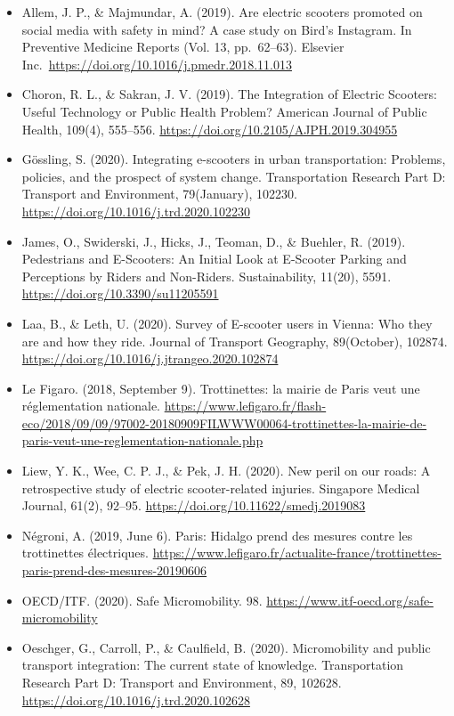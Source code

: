 \documentclass[
]{book}
\providecommand{\tightlist}{%
  \setlength{\itemsep}{0pt}\setlength{\parskip}{0pt}}
\begin{document}
\begin{itemize}
\tightlist
\item
  Allem, J. P., \& Majmundar, A. (2019). Are electric scooters promoted on social media with safety in mind? A case study on Bird's Instagram. In Preventive Medicine Reports (Vol. 13, pp.~62--63). Elsevier Inc.~\url{https://doi.org/10.1016/j.pmedr.2018.11.013}
\item
  Choron, R. L., \& Sakran, J. V. (2019). The Integration of Electric Scooters: Useful Technology or Public Health Problem? American Journal of Public Health, 109(4), 555--556. \url{https://doi.org/10.2105/AJPH.2019.304955}
\item
  Gössling, S. (2020). Integrating e-scooters in urban transportation: Problems, policies, and the prospect of system change. Transportation Research Part D: Transport and Environment, 79(January), 102230. \url{https://doi.org/10.1016/j.trd.2020.102230}
\item
  James, O., Swiderski, J., Hicks, J., Teoman, D., \& Buehler, R. (2019). Pedestrians and E-Scooters: An Initial Look at E-Scooter Parking and Perceptions by Riders and Non-Riders. Sustainability, 11(20), 5591. \url{https://doi.org/10.3390/su11205591}
\item
  Laa, B., \& Leth, U. (2020). Survey of E-scooter users in Vienna: Who they are and how they ride. Journal of Transport Geography, 89(October), 102874. \url{https://doi.org/10.1016/j.jtrangeo.2020.102874}
\item
  Le Figaro. (2018, September 9). Trottinettes: la mairie de Paris veut une réglementation nationale. \url{https://www.lefigaro.fr/flash-eco/2018/09/09/97002-20180909FILWWW00064-trottinettes-la-mairie-de-paris-veut-une-reglementation-nationale.php}
\item
  Liew, Y. K., Wee, C. P. J., \& Pek, J. H. (2020). New peril on our roads: A retrospective study of electric scooter-related injuries. Singapore Medical Journal, 61(2), 92--95. \url{https://doi.org/10.11622/smedj.2019083}
\item
  Négroni, A. (2019, June 6). Paris: Hidalgo prend des mesures contre les trottinettes électriques. \url{https://www.lefigaro.fr/actualite-france/trottinettes-paris-prend-des-mesures-20190606}
\item
  OECD/ITF. (2020). Safe Micromobility. 98. \url{https://www.itf-oecd.org/safe-micromobility}
\item
  Oeschger, G., Carroll, P., \& Caulfield, B. (2020). Micromobility and public transport integration: The current state of knowledge. Transportation Research Part D: Transport and Environment, 89, 102628. \url{https://doi.org/10.1016/j.trd.2020.102628}

\end{itemize}
\end{document}
